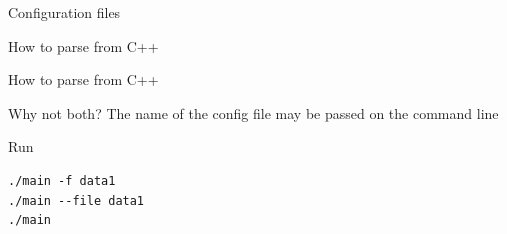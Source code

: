 \documentclass[10pt]{beamer}
\begin{document}
\begin{frame}[fragile]{Configuration files}
    
\end{frame}

\begin{frame}[fragile]{How to parse from C++}
    
\end{frame}

\begin{frame}[fragile]{How to parse from C++}
    
\end{frame}

\begin{frame}[fragile]{Why not both?}
    The name of the config file may be passed on the command line
        
    
\end{frame}

\begin{frame}[fragile]{Run}
    \begin{verbatim}
./main -f data1
./main --file data1
./main
    \end{verbatim}
\end{frame}
\end{document}
